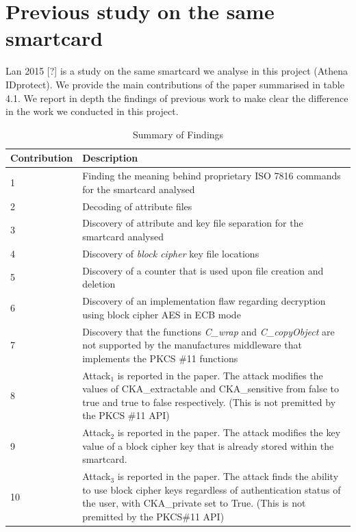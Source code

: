 \documentclass[bsc,frontabs,twoside,singlespacing,parskip,deptreport]{infthesis}     %
\begin{document}
\section{Previous study on the same smartcard}

Lan 2015 [?] is a study on the same smartcard we analyse in this project (Athena IDprotect). We provide the main contributions of the paper summarised in table 4.1. We report in depth the findings of previous work to make clear the difference in the work we conducted in this project.

\begin{table}[H]
\begin{tabular}{|l|p{10cm}|}
\hline
Contribution & Description\\
\hline
1 & Finding the meaning behind proprietary ISO 7816 commands for the smartcard analysed\\
\hline
2 & Decoding of attribute files\\
\hline
3 & Discovery of attribute and key file separation for the smartcard analysed\\
\hline
4 &Discovery of \textit{block cipher} key file locations\\
\hline
5 & Discovery of a counter that is used upon file creation and deletion\\
\hline
6 & Discovery of an implementation flaw regarding decryption using block cipher AES in ECB mode\\
\hline
7 & Discovery that the functions \textit{C\_wrap} and \textit{C\_copyObject} are not supported by the manufactures middleware that implements the PKCS \#11 functions\\
\hline
8 & Attack$_1$ is reported in the paper. The attack modifies the values of CKA\_extractable and CKA\_sensitive from false to true and true to false respectively. (This is not premitted by the PKCS \#11 API)\\
\hline
9 & Attack$_2$ is reported in the paper. The attack modifies the key value of a block cipher key that is already stored within the smartcard.\\
\hline
10 & Attack$_3$ is reported in the paper. The attack finds the ability to use block cipher keys regardless of authentication status of the user, with CKA\_private set to True. (This is not premitted by the PKCS\#11 API)\\
\hline
\end{tabular}
\caption{Summary of Findings}
\end{table}
\end{document}

